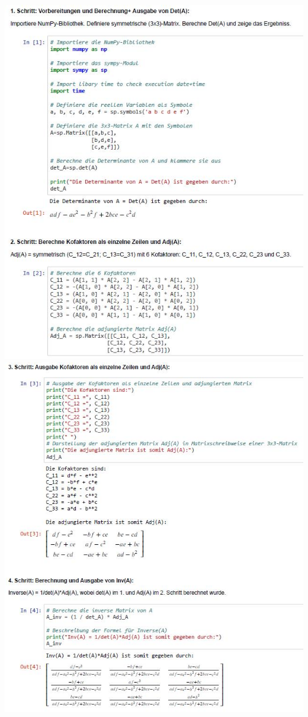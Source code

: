 \documentclass[12pt]{article}
\begin{document}
\begin{center} 
\hspace*{-0.5cm}
\includegraphics[width=1.12\textwidth]{Inv_Matrix-Step1+2}
\hspace*{-1.0cm} 
\includegraphics[width=1.15\textwidth]{Inv_Matrix-Step3+4}
\end{center}
\end{document}
